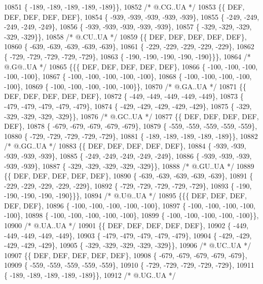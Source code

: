\begin{DoxyCode}
10851 \{ -189, -189, -189, -189, -189\}\},
10852 \textcolor{comment}{/*  @.CG..UA */}
10853 \{\{  DEF,  DEF,  DEF,  DEF,  DEF\},
10854 \{ -939, -939, -939, -939, -939\},
10855 \{ -249, -249, -249, -249, -249\},
10856 \{ -939, -939, -939, -939, -939\},
10857 \{ -329, -329, -329, -329, -329\}\},
10858 \textcolor{comment}{/*  @.CU..UA */}
10859 \{\{  DEF,  DEF,  DEF,  DEF,  DEF\},
10860 \{ -639, -639, -639, -639, -639\},
10861 \{ -229, -229, -229, -229, -229\},
10862 \{ -729, -729, -729, -729, -729\},
10863 \{ -190, -190, -190, -190, -190\}\}\},
10864 \textcolor{comment}{/*  @.G@..UA */}
10865 \{\{\{  DEF,  DEF,  DEF,  DEF,  DEF\},
10866 \{ -100, -100, -100, -100, -100\},
10867 \{ -100, -100, -100, -100, -100\},
10868 \{ -100, -100, -100, -100, -100\},
10869 \{ -100, -100, -100, -100, -100\}\},
10870 \textcolor{comment}{/*  @.GA..UA */}
10871 \{\{  DEF,  DEF,  DEF,  DEF,  DEF\},
10872 \{ -449, -449, -449, -449, -449\},
10873 \{ -479, -479, -479, -479, -479\},
10874 \{ -429, -429, -429, -429, -429\},
10875 \{ -329, -329, -329, -329, -329\}\},
10876 \textcolor{comment}{/*  @.GC..UA */}
10877 \{\{  DEF,  DEF,  DEF,  DEF,  DEF\},
10878 \{ -679, -679, -679, -679, -679\},
10879 \{ -559, -559, -559, -559, -559\},
10880 \{ -729, -729, -729, -729, -729\},
10881 \{ -189, -189, -189, -189, -189\}\},
10882 \textcolor{comment}{/*  @.GG..UA */}
10883 \{\{  DEF,  DEF,  DEF,  DEF,  DEF\},
10884 \{ -939, -939, -939, -939, -939\},
10885 \{ -249, -249, -249, -249, -249\},
10886 \{ -939, -939, -939, -939, -939\},
10887 \{ -329, -329, -329, -329, -329\}\},
10888 \textcolor{comment}{/*  @.GU..UA */}
10889 \{\{  DEF,  DEF,  DEF,  DEF,  DEF\},
10890 \{ -639, -639, -639, -639, -639\},
10891 \{ -229, -229, -229, -229, -229\},
10892 \{ -729, -729, -729, -729, -729\},
10893 \{ -190, -190, -190, -190, -190\}\}\},
10894 \textcolor{comment}{/*  @.U@..UA */}
10895 \{\{\{  DEF,  DEF,  DEF,  DEF,  DEF\},
10896 \{ -100, -100, -100, -100, -100\},
10897 \{ -100, -100, -100, -100, -100\},
10898 \{ -100, -100, -100, -100, -100\},
10899 \{ -100, -100, -100, -100, -100\}\},
10900 \textcolor{comment}{/*  @.UA..UA */}
10901 \{\{  DEF,  DEF,  DEF,  DEF,  DEF\},
10902 \{ -449, -449, -449, -449, -449\},
10903 \{ -479, -479, -479, -479, -479\},
10904 \{ -429, -429, -429, -429, -429\},
10905 \{ -329, -329, -329, -329, -329\}\},
10906 \textcolor{comment}{/*  @.UC..UA */}
10907 \{\{  DEF,  DEF,  DEF,  DEF,  DEF\},
10908 \{ -679, -679, -679, -679, -679\},
10909 \{ -559, -559, -559, -559, -559\},
10910 \{ -729, -729, -729, -729, -729\},
10911 \{ -189, -189, -189, -189, -189\}\},
10912 \textcolor{comment}{/*  @.UG..UA */}

\end{DoxyCode}
